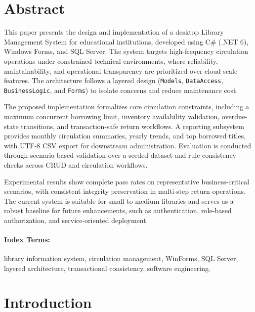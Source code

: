 \documentclass[12pt,a4paper]{article}
\begin{document}
\section*{Abstract}
This paper presents the design and implementation of a desktop Library Management System for educational institutions, developed using C\# (.NET 6), Windows Forms, and SQL Server. The system targets high-frequency circulation operations under constrained technical environments, where reliability, maintainability, and operational transparency are prioritized over cloud-scale features. The architecture follows a layered design (\texttt{Models}, \texttt{DataAccess}, \texttt{BusinessLogic}, and \texttt{Forms}) to isolate concerns and reduce maintenance cost.

The proposed implementation formalizes core circulation constraints, including a maximum concurrent borrowing limit, inventory availability validation, overdue-state transitions, and transaction-safe return workflows. A reporting subsystem provides monthly circulation summaries, yearly trends, and top borrowed titles, with UTF-8 CSV export for downstream administration. Evaluation is conducted through scenario-based validation over a seeded dataset and rule-consistency checks across CRUD and circulation workflows.

Experimental results show complete pass rates on representative business-critical scenarios, with consistent integrity preservation in multi-step return operations. The current system is suitable for small-to-medium libraries and serves as a robust baseline for future enhancements, such as authentication, role-based authorization, and service-oriented deployment.

\paragraph{Index Terms:} library information system, circulation management, WinForms, SQL Server, layered architecture, transactional consistency, software engineering.

\newpage
\tableofcontents
\newpage
{}

\section{Introduction}
\end{document}
